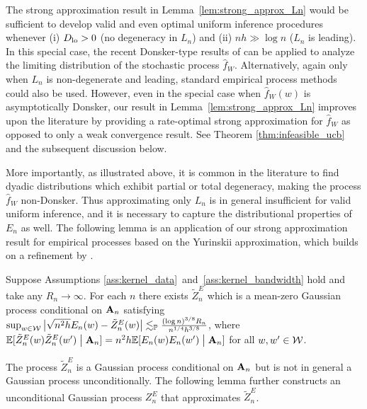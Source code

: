 The strong approximation result in Lemma~\ref{lem:strong_approx_Ln} would be
sufficient to develop valid and even optimal
uniform inference procedures whenever
(i) $D_{\textup{lo}} > 0$ (no degeneracy in $L_n$) and
(ii) $n h \gg \log n$ ($L_n$ is leading).
In this special case, the recent Donsker-type results of
\citet{davezies2021exchangeable}
can be applied to analyze the limiting distribution
of the stochastic process $\hat{f}_W$.
Alternatively,
again only when $L_n$ is non-degenerate and leading,
standard empirical process methods could also be used.
However, even in the special case when $\hat{f}_W(w)$ is asymptotically
Donsker, our result in Lemma~\ref{lem:strong_approx_Ln}
improves upon the literature by providing a rate-optimal strong approximation
for $\hat{f}_W$ as opposed to only a weak convergence result.
See Theorem \ref{thm:infeasible_ucb} and the subsequent
discussion below.

More importantly, as illustrated above,
it is common in the literature to find dyadic
distributions which exhibit partial or total degeneracy, making the process
$\hat{f}_W$ non-Donsker.
Thus approximating only $L_n$ is in general insufficient
for valid uniform inference,
and it is necessary to capture the distributional properties of $E_n$ as well.
The following lemma is an application of
our strong approximation result for
empirical processes based on the Yurinskii approximation,
which builds on a refinement by \citet{belloni2019conditional}.

\begin{lemma}
  \label{lem:conditional_strong_approx_En}

  Suppose Assumptions
  \ref{ass:kernel_data}~and~\ref{ass:kernel_bandwidth} hold
  and take any $R_n \to \infty$.
  For each $n$ there exists
  $\tilde Z^E_n$
  which is a mean-zero Gaussian process
  conditional on $\mathbf{A}_n$ satisfying
  $\sup_{w \in \mathcal{W}}
  \big| \sqrt{n^2h} E_n(w) - \tilde Z_n^E(w) \big|
  \lesssim_{\mathbb{P}} \frac{(\log n)^{3/8} R_n}{n^{1/4}h^{3/8}}$,
  where $\mathbb{E}[\tilde Z_n^E(w)\tilde Z_n^E(w')\bigm\vert \mathbf{A}_n]
  =n^2h\mathbb{E}[E_n(w)E_n(w')\bigm\vert \mathbf{A}_n]$
  for all $w, w' \in \mathcal{W}$.
\end{lemma}

The process $\tilde Z_n^E$
is a Gaussian process conditional on $\mathbf{A}_n$ but is not in general a
Gaussian process unconditionally.
The following lemma further constructs an unconditional Gaussian process
$Z_n^E$ that approximates $\tilde Z_n^E$.

